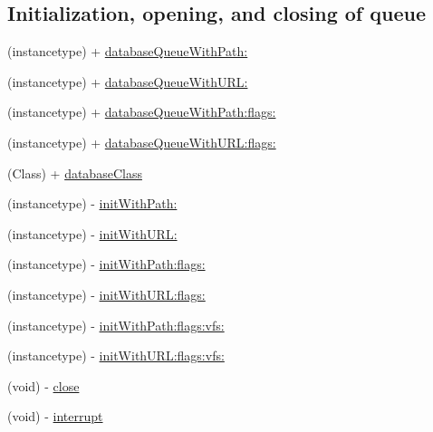 \subsection*{Initialization, opening, and closing of queue}
\label{_amgrp655593ffab6e21838f5ebeedaa7009e5}%


 

 \begin{DoxyCompactItemize}
\item 
(instancetype) + \mbox{\hyperlink{interface_o_p_t_l_y_f_m_d_b_database_queue_a70c1b4d9fba1dec4e6b6e1d19df6d7d9}{database\+Queue\+With\+Path\+:}}
\item 
(instancetype) + \mbox{\hyperlink{interface_o_p_t_l_y_f_m_d_b_database_queue_af55595f0000fc655efb628f84a90a4cd}{database\+Queue\+With\+U\+R\+L\+:}}
\item 
(instancetype) + \mbox{\hyperlink{interface_o_p_t_l_y_f_m_d_b_database_queue_a04d59bdf3e5e66955ead0ee7cd39bae7}{database\+Queue\+With\+Path\+:flags\+:}}
\item 
(instancetype) + \mbox{\hyperlink{interface_o_p_t_l_y_f_m_d_b_database_queue_a9ae8cd3cf5543edf1f92ceb7125af1bd}{database\+Queue\+With\+U\+R\+L\+:flags\+:}}
\item 
(Class) + \mbox{\hyperlink{interface_o_p_t_l_y_f_m_d_b_database_queue_a998bccd16ef33262eac8a8e88e23d78b}{database\+Class}}
\item 
(instancetype) -\/ \mbox{\hyperlink{interface_o_p_t_l_y_f_m_d_b_database_queue_affaf3bb46813b9631b2dc4c8e0703e3a}{init\+With\+Path\+:}}
\item 
(instancetype) -\/ \mbox{\hyperlink{interface_o_p_t_l_y_f_m_d_b_database_queue_a554f6477a5ed4fe69ae83bb2200edb48}{init\+With\+U\+R\+L\+:}}
\item 
(instancetype) -\/ \mbox{\hyperlink{interface_o_p_t_l_y_f_m_d_b_database_queue_ab6767258c1a06d640d46994382479be4}{init\+With\+Path\+:flags\+:}}
\item 
(instancetype) -\/ \mbox{\hyperlink{interface_o_p_t_l_y_f_m_d_b_database_queue_a4136c9e6ec92245fee3c768a370e670f}{init\+With\+U\+R\+L\+:flags\+:}}
\item 
(instancetype) -\/ \mbox{\hyperlink{interface_o_p_t_l_y_f_m_d_b_database_queue_a208f0214f8b43cb1b41d5ecfe481d6ae}{init\+With\+Path\+:flags\+:vfs\+:}}
\item 
(instancetype) -\/ \mbox{\hyperlink{interface_o_p_t_l_y_f_m_d_b_database_queue_ae2e52eded98d3648fb6251de8404c9f8}{init\+With\+U\+R\+L\+:flags\+:vfs\+:}}
\item 
(void) -\/ \mbox{\hyperlink{interface_o_p_t_l_y_f_m_d_b_database_queue_a342c60b5e86c99c87c10d562f23f32ff}{close}}
\item 
(void) -\/ \mbox{\hyperlink{interface_o_p_t_l_y_f_m_d_b_database_queue_aabcbc11840a3e9e384ca5a6503292ef5}{interrupt}}
\end{DoxyCompactItemize}


